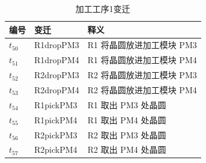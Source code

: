 \begin{table}[H]
	\centering
	\caption{加工工序1变迁}
	\begin{tabular}{lll}
		\toprule
		编号 & 变迁      & 释义                      \\
		\hline
		$t_{50}$  & R1dropPM3 & R1 将晶圆放进加工模块 PM3 \\
		$t_{51}$  & R1dropPM4 & R1 将晶圆放进加工模块 PM4 \\
		$t_{52}$  & R2dropPM3 & R2 将晶圆放进加工模块 PM3 \\
		$t_{53}$  & R2dropPM4 & R2 将晶圆放进加工模块 PM4 \\
		$t_{54}$  & R1pickPM3 & R1 取出 PM3 处晶圆        \\
		$t_{55}$  & R1pickPM4 & R1 取出 PM4 处晶圆        \\
		$t_{56}$  & R2pickPM3 & R2 取出 PM3 处晶圆        \\
		$t_{57}$  & R2pickPM4 & R2 取出 PM4 处晶圆        \\
		\bottomrule
	\end{tabular}
\end{table}

